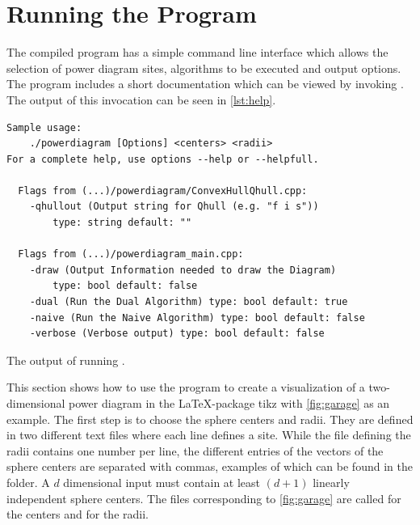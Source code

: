 \section{Running the Program}
\label{sec:running_the_program}
The compiled program has a simple command line interface which allows the selection of power diagram sites, algorithms to be executed and output options.
The program includes a short documentation which can be viewed by invoking .
The output of this invocation can be seen in \cref{lst:help}.
\begin{listing}[tb]
    \begin{verbatim}
Sample usage:
    ./powerdiagram [Options] <centers> <radii>
For a complete help, use options --help or --helpfull.

  Flags from (...)/powerdiagram/ConvexHullQhull.cpp:
    -qhullout (Output string for Qhull (e.g. "f i s"))
        type: string default: ""

  Flags from (...)/powerdiagram_main.cpp:
    -draw (Output Information needed to draw the Diagram)
        type: bool default: false
    -dual (Run the Dual Algorithm) type: bool default: true
    -naive (Run the Naive Algorithm) type: bool default: false
    -verbose (Verbose output) type: bool default: false
    \end{verbatim}
    \caption{The output of running .}
    \label{lst:help}
\end{listing}

This section shows how to use the program to create a visualization of a two-dimensional power diagram in the \LaTeX-package tikz with \cref{fig:garage} as an example.
The first step is to choose the sphere centers and radii.
They are defined in two different text files where each line defines a site.
While the file defining the radii contains one number per line, the different entries of the vectors of the sphere centers are separated with commas, examples of which can be found in the  folder.
A $d$ dimensional input must contain at least $(d+1)$ linearly independent sphere centers.
The files corresponding to \cref{fig:garage} are called  for the centers and  for the radii.

